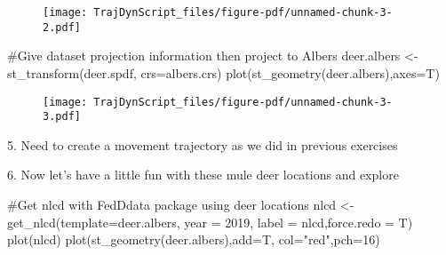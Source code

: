 \documentclass[
  letterpaper,
]{book}
\newenvironment{Shaded}{\begin{snugshade}}{\end{snugshade}}
\newcommand{\AttributeTok}[1]{\textcolor[rgb]{0.40,0.45,0.13}{#1}}
\newcommand{\CommentTok}[1]{\textcolor[rgb]{0.37,0.37,0.37}{#1}}
\newcommand{\DecValTok}[1]{\textcolor[rgb]{0.68,0.00,0.00}{#1}}
\newcommand{\FunctionTok}[1]{\textcolor[rgb]{0.28,0.35,0.67}{#1}}
\newcommand{\NormalTok}[1]{\textcolor[rgb]{0.00,0.23,0.31}{#1}}
\newcommand{\OtherTok}[1]{\textcolor[rgb]{0.00,0.23,0.31}{#1}}
\newcommand{\SpecialCharTok}[1]{\textcolor[rgb]{0.37,0.37,0.37}{#1}}
\newcommand{\StringTok}[1]{\textcolor[rgb]{0.13,0.47,0.30}{#1}}
\begin{document}
\begin{figure}[H]

{\centering \texttt{[image: TrajDynScript\_files/figure-pdf/unnamed-chunk-3-2.pdf]}

}

\end{figure}

\begin{Shaded}
\begin{Highlighting}[]
\CommentTok{\#Give dataset projection information then project to Albers}
\NormalTok{deer.albers }\OtherTok{\textless{}{-}} \FunctionTok{st\_transform}\NormalTok{(deer.spdf, }\AttributeTok{crs=}\NormalTok{albers.crs)}
\FunctionTok{plot}\NormalTok{(}\FunctionTok{st\_geometry}\NormalTok{(deer.albers),}\AttributeTok{axes=}\NormalTok{T)}
\end{Highlighting}
\end{Shaded}

\begin{figure}[H]

{\centering \texttt{[image: TrajDynScript\_files/figure-pdf/unnamed-chunk-3-3.pdf]}

}

\end{figure}

5. Need to create a movement trajectory as we did in previous exercises

\begin{Shaded}
\end{Shaded}

6. Now let's have a little fun with these mule deer locations and
explore

\begin{Shaded}
\begin{Highlighting}[]
\CommentTok{\#Get nlcd with FedDdata package using deer locations}
\NormalTok{nlcd }\OtherTok{\textless{}{-}} \FunctionTok{get\_nlcd}\NormalTok{(}\AttributeTok{template=}\NormalTok{deer.albers, }\AttributeTok{year =} \DecValTok{2019}\NormalTok{, }\AttributeTok{label =} \StringTok{\textquotesingle{}nlcd\textquotesingle{}}\NormalTok{,}\AttributeTok{force.redo =}\NormalTok{ T)}
\FunctionTok{plot}\NormalTok{(nlcd)}
\FunctionTok{plot}\NormalTok{(}\FunctionTok{st\_geometry}\NormalTok{(deer.albers),}\AttributeTok{add=}\NormalTok{T, }\AttributeTok{col=}\StringTok{"red"}\NormalTok{,}\AttributeTok{pch=}\DecValTok{16}\NormalTok{)}
\end{Highlighting}
\end{Shaded}
\end{document}
